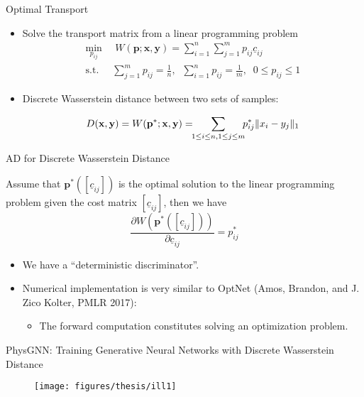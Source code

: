 \documentclass[usenames,dvipsnames]{beamer}
\newcommand{\uc}{\underline{c}}
\newcommand{\by}{\mathbf{y}}
\begin{document}
\begin{frame}{Optimal Transport}
	\begin{itemize}
\item Solve the transport matrix from a linear programming problem 
\begin{equation}
	\begin{aligned}
		\min_{p_{ij}} &\; W(\mathbf{p}; \mathbf{x}, \by) = \sum_{i=1}^n \sum_{j=1}^m p_{ij} \underline{c}_{ij} \\
		\mathrm{s.t.}\;\; & \sum_{j=1}^m p_{ij} = \frac{1}{n},\;\; \sum_{i=1}^n p_{ij} = \frac{1}{m},\;\; 0\leq p_{ij}\leq 1
	\end{aligned}
\end{equation}

\item Discrete Wasserstein distance between two sets of samples:

$$	D(\mathbf{x}, \by) = W(\mathbf{p}^*; \mathbf{x}, \by) = \hspace{-4pt} \sum_{1\leq i\leq n, 1\leq j\leq m} \hspace{-4pt} p^*_{ij} \|x_i-y_j\|_1$$


	\end{itemize}
\end{frame}


\begin{frame}{AD for Discrete Wasserstein Distance}
\begin{theorem}
	Assume that $\mathbf{p}^*([\uc_{ij}])$ is the optimal solution to the linear programming problem given the cost matrix $[\uc_{ij}]$, then we have 
	\begin{equation*}
		\frac{\partial W(\mathbf{p}^*([\uc_{ij}]))}{\partial \uc_{ij}} = p^*_{ij}
	\end{equation*}
\end{theorem}

\begin{itemize}
\item We have a ``deterministic discriminator''. 
\item Numerical implementation is very similar to OptNet (Amos, Brandon, and J. Zico Kolter, PMLR 2017):
\begin{itemize}
\item The forward computation constitutes solving an optimization problem. 
\end{itemize}
\end{itemize}
\end{frame}


\begin{frame}{PhysGNN: Training Generative Neural Networks with Discrete Wasserstein Distance}
	\begin{figure}[htbp]
	\centering
	\texttt{[image: figures/thesis/ill1]}
\end{figure}
\end{frame}
\end{document}
